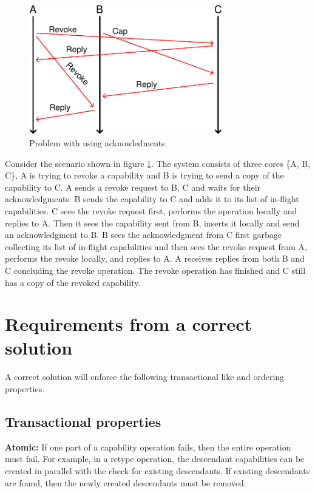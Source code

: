 \documentclass[a4paper,twoside]{report} %
\begin{document}
\begin{figure}[t]
 \includegraphics[width=0.75\textwidth]{acks-problem.pdf}
 \caption{Problem with using acknowledments}\label{fig:acks-problem}
\end{figure}

Consider the scenario shown in figure \ref{fig:acks-problem}. The
system consists of three cores \{A, B, C\}, A is trying to revoke a
capability and B is trying to send a copy of the capability to C. A
sends a revoke request to B, C and waits for their acknowledgments. B
sends the capability to C and adds it to its list of in-flight
capabilities. C sees the revoke request first, performs the operation
locally and replies to A. Then it sees the capability sent from B,
inserts it locally and send an acknowledgment to B. B sees the
acknowledgment from C first garbage collecting its list of in-flight
capabilities and then sees the revoke request from A, performs the
revoke locally, and replies to A. A receives replies from both B and C
concluding the revoke operation. The revoke operation has finished and
C still has a copy of the revoked capability.

\section{Requirements from a correct solution}\label{sec:requirements}
A correct solution will enforce the following transactional like and
ordering properties.

\subsection{Transactional properties}
\textbf{Atomic:} If one part of a capability operation fails, then the
entire operation must fail. For example, in a retype operation, the
descendant capabilities can be created in parallel with the check for
existing descendants. If existing descendants are found, then the
newly created descendants must be removed.
\end{document}
